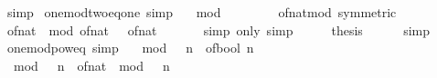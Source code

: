 \begin{isabellebody}
\ simp\isanewline
{}\isamarkupfalse%
%
\endisatagproof
{\isafoldproof}%
%
\isadelimproof
\isanewline
%
\endisadelimproof
\isanewline
{}\isamarkupfalse%
\ one{\isacharunderscore}{\kern0pt}mod{\isacharunderscore}{\kern0pt}two{\isacharunderscore}{\kern0pt}eq{\isacharunderscore}{\kern0pt}one\ {\isacharbrackleft}{\kern0pt}simp{\isacharbrackright}{\kern0pt}{\isacharcolon}{\kern0pt}\isanewline
\ \ {\isachardoublequoteopen}{}\ mod\ {}\ {\isacharequal}{\kern0pt}\ {}{\isachardoublequoteclose}\isanewline
%
\isadelimproof
%
\endisadelimproof
%
\isatagproof
{}\isamarkupfalse%
\ {\isacharminus}{\kern0pt}\isanewline
\ \ \isamarkupfalse%
\ of{\isacharunderscore}{\kern0pt}nat{\isacharunderscore}{\kern0pt}mod\ {\isacharbrackleft}{\kern0pt}symmetric{\isacharbrackright}{\kern0pt}\ \isamarkupfalse%
\ {\isachardoublequoteopen}of{\isacharunderscore}{\kern0pt}nat\ {}\ mod\ of{\isacharunderscore}{\kern0pt}nat\ {}\ {\isacharequal}{\kern0pt}\ of{\isacharunderscore}{\kern0pt}nat\ {}{\isachardoublequoteclose}\isanewline
\ \ \ \ \isamarkupfalse%
\ {\isacharparenleft}{\kern0pt}simp\ only{\isacharcolon}{\kern0pt}{\isacharparenright}{\kern0pt}\ simp\isanewline
\ \ \isamarkupfalse%
\ \isamarkupfalse%
\ {\isacharquery}{\kern0pt}thesis\isanewline
\ \ \ \ \isamarkupfalse%
\ simp\isanewline
{}\isamarkupfalse%
%
\endisatagproof
{\isafoldproof}%
%
\isadelimproof
\isanewline
%
\endisadelimproof
\isanewline
{}\isamarkupfalse%
\ one{\isacharunderscore}{\kern0pt}mod{\isacharunderscore}{\kern0pt}{}{\isacharunderscore}{\kern0pt}pow{\isacharunderscore}{\kern0pt}eq\ {\isacharbrackleft}{\kern0pt}simp{\isacharbrackright}{\kern0pt}{\isacharcolon}{\kern0pt}\isanewline
\ \ {\isachardoublequoteopen}{}\ mod\ {\isacharparenleft}{\kern0pt}{}\ {\isacharcircum}{\kern0pt}\ n{\isacharparenright}{\kern0pt}\ {\isacharequal}{\kern0pt}\ of{\isacharunderscore}{\kern0pt}bool\ {\isacharparenleft}{\kern0pt}n\ {\isachargreater}{\kern0pt}\ {}{\isacharparenright}{\kern0pt}{\isachardoublequoteclose}\isanewline
%
\isadelimproof
%
\endisadelimproof
%
\isatagproof
{}\isamarkupfalse%
\ {\isacharminus}{\kern0pt}\isanewline
\ \ \isamarkupfalse%
\ {\isachardoublequoteopen}{}\ mod\ {\isacharparenleft}{\kern0pt}{}\ {\isacharcircum}{\kern0pt}\ n{\isacharparenright}{\kern0pt}\ {\isacharequal}{\kern0pt}\ of{\isacharunderscore}{\kern0pt}nat\ {\isacharparenleft}{\kern0pt}{}\ mod\ {\isacharparenleft}{\kern0pt}{}\ {\isacharcircum}{\kern0pt}\ n{\isacharparenright}{\kern0pt}{\isacharparenright}{\kern0pt}{\isachardoublequoteclose}\isanewline

\end{isabellebody}
